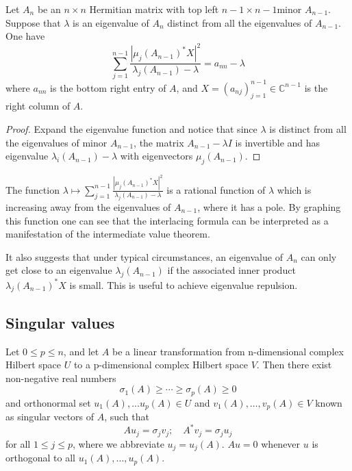\begin{proposition}
    Let $A_n$ be an $n\times n$ Hermitian matrix with top left $n-1\times n-1$minor $A_{n-1}$. Suppose that $\lambda$ is an eigenvalue of $A_n$ distinct from all the eigenvalues of $A_{n-1}$. One have 
    \begin{equation}\label{Eigenvalue equation}
        \sum_{j=1}^{n-1} \frac{|\mu_j(A_{n-1})^*X |^2}{\lambda_j(A_{n-1})-\lambda} = a_{nn}-\lambda
    \end{equation}
    where $a_{nn}$ is the bottom right entry of $A$, and $X=(a_{nj})_{j=1}^{n-1}\in \mathbb C^{n-1}$ is the right column of $A$.
\end{proposition}

\begin{proof}
    Expand the eigenvalue function and notice that since $\lambda$ is distinct from all the eigenvalues of minor $A_{n-1}$, the matrix $A_{n-1}-\lambda I$ is invertible and has eigenvalue $\lambda_i(A_{n-1})-\lambda$ with eigenvectors $\mu_j(A_{n-1})$.
\end{proof}

The function $\lambda \mapsto \sum_{j=1}^{n-1} \frac{|\mu_j(A_{n-1})^*X |^2}{\lambda_j(A_{n-1})-\lambda}$ is a rational function of $\lambda$ which is increasing away from the eigenvalues of $A_{n-1}$, where it has a pole.
By graphing this function one can see that the interlacing formula can be interpreted as a manifestation of the intermediate value theorem.

It also suggests that under typical circumstances, an eigenvalue of $A_n$ can only get close to an eigenvalue $\lambda_j(A_{n-1})$ if the associated inner product $\lambda_j(A_{n-1})^*X$ is small. This is useful to achieve eigenvalue repulsion.


\subsection{Singular values}

\begin{theorem}
    Let $0\leq p\leq n$, and let $A$ be a linear transformation from n-dimensional complex Hilbert space $U$ to a p-dimensional complex Hilbert space $V$. Then there exist non-negative real numbers
    \begin{equation*}
        \sigma_1(A)\geq \cdots \geq \sigma_p(A) \geq 0
    \end{equation*}
    and orthonormal set $u_1(A),...u_p(A) \in U$ and $v_1(A),\dots,v_p(A) \in V$ known as singular vectors of $A$, such that
    \begin{equation*}
        Au_j=\sigma_jv_j ; \quad A^*v_j = \sigma_ju_j
    \end{equation*}
    for all $1\leq j \leq p$, where we abbreviate $u_j=u_j(A)$.
    $Au=0$ whenever $u$ is orthogonal to all $u_1(A),\dots,u_p(A)$.
\end{theorem}

